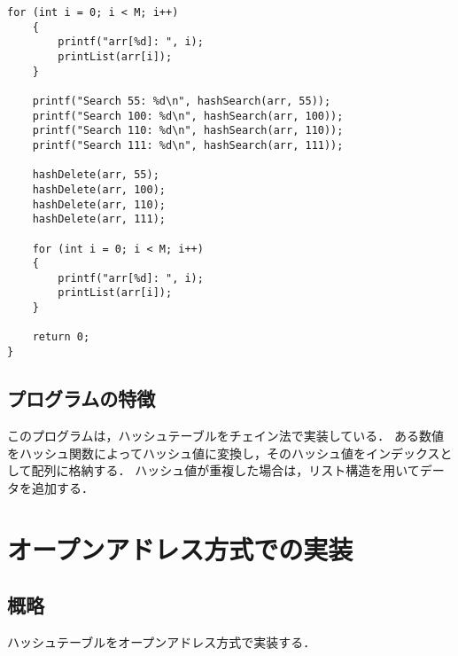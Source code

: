 \documentclass{ltjsarticle}
\begin{document}
\begin{lstlisting}[frame=single, lineskip=-5pt]
    for (int i = 0; i < M; i++)
    {
        printf("arr[%d]: ", i);
        printList(arr[i]);
    }

    printf("Search 55: %d\n", hashSearch(arr, 55));
    printf("Search 100: %d\n", hashSearch(arr, 100));
    printf("Search 110: %d\n", hashSearch(arr, 110));
    printf("Search 111: %d\n", hashSearch(arr, 111));

    hashDelete(arr, 55);
    hashDelete(arr, 100);
    hashDelete(arr, 110);
    hashDelete(arr, 111);

    for (int i = 0; i < M; i++)
    {
        printf("arr[%d]: ", i);
        printList(arr[i]);
    }

    return 0;
}

\end{lstlisting}

\subsection{プログラムの特徴}
このプログラムは，ハッシュテーブルをチェイン法で実装している．
ある数値をハッシュ関数によってハッシュ値に変換し，そのハッシュ値をインデックスとして配列に格納する．
ハッシュ値が重複した場合は，リスト構造を用いてデータを追加する．

\section{オープンアドレス方式での実装}
\subsection{概略}
ハッシュテーブルをオープンアドレス方式で実装する．
\end{document}
